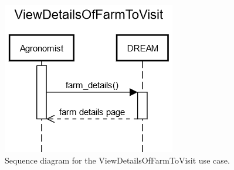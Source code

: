 \documentclass{article}
\begin{document}
\begin{figure}[H]
    \centering
    \includegraphics[scale=0.75]{sequence_diagrams/ViewDetailsOfFarmToVisit.png}
    \caption{Sequence diagram for the ViewDetailsOfFarmToVisit use case.}
\end{figure}
\newpage
\end{document}
